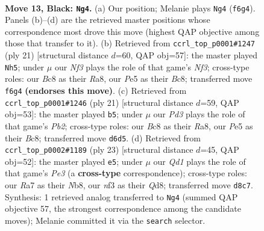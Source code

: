 \documentclass[11pt]{article}
\begin{document}
\clearpage

\begin{figure}[p]\centering
\begin{subfigure}{0.46\textwidth}\centering
\resizebox{\linewidth}{!}{%
\newchessgame
\chessboard[
  setfen={1nbq1rk1/r3bppp/pp1p1n2/4p1B1/PP2P3/2NB1N2/2P2PPP/R2Q1RK1 b - - 1 13},
  showmover=false,
  pgfstyle=straightmove, color=movearrow, markmove={f6-g4}
]}
\caption{}
\end{subfigure}\hfill
\begin{subfigure}{0.46\textwidth}\centering
\resizebox{\linewidth}{!}{%
\newchessgame
\chessboard[
  setfen={r1bq1rk1/1p2bppp/p2ppn2/n5B1/3NP3/2N3Q1/PPP1BPPP/2KR3R b - - 5 11},
  showmover=false,
  pgfstyle=straightmove, color=movearrow, markmove={f6-h5}
]}
\caption{}
\end{subfigure}
\\[4pt]
\begin{subfigure}{0.46\textwidth}\centering
\resizebox{\linewidth}{!}{%
\newchessgame
\chessboard[
  setfen={r1bq1rk1/1p2bppp/p2ppn2/n5B1/3NPP2/2NQ4/PPP1B1PP/2KR3R b - - 0 11},
  showmover=false,
  pgfstyle=straightmove, color=movearrow, markmove={b7-b5}
]}
\caption{}
\end{subfigure}\hfill
\begin{subfigure}{0.46\textwidth}\centering
\resizebox{\linewidth}{!}{%
\newchessgame
\chessboard[
  setfen={1nbq1rk1/r3bppp/p2ppn2/6B1/1p1NPP2/5B2/PPPQN1PP/2KR3R b - - 3 12},
  showmover=false,
  pgfstyle=straightmove, color=movearrow, markmove={e6-e5}
]}
\caption{}
\end{subfigure}
\caption{\textbf{Move 13, Black: \texttt{Ng4}.} (a) Our position; Melanie plays \texttt{Ng4} (\texttt{f6g4}). Panels (b)--(d) are the retrieved master positions whose correspondence most drove this move (highest QAP objective among those that transfer to it). (b) Retrieved from \texttt{ccrl\_top\_p0001\#1247} (ply 21) [structural distance $d$=60, QAP obj=57]: the master played \texttt{Nh5}; under $\mu$ our \emph{Nf3} plays the role of that game's \emph{Nf3}; cross-type roles: our \emph{B}c8 as their \emph{R}a8, our \emph{P}e5 as their \emph{B}c8; transferred move \texttt{f6g4} \textbf{(endorses this move)}. (c) Retrieved from \texttt{ccrl\_top\_p0001\#1246} (ply 21) [structural distance $d$=59, QAP obj=53]: the master played \texttt{b5}; under $\mu$ our \emph{Pd3} plays the role of that game's \emph{Pb2}; cross-type roles: our \emph{B}c8 as their \emph{R}a8, our \emph{P}e5 as their \emph{B}c8; transferred move \texttt{d6d5}. (d) Retrieved from \texttt{ccrl\_top\_p0002\#1189} (ply 23) [structural distance $d$=45, QAP obj=52]: the master played \texttt{e5}; under $\mu$ our \emph{Qd1} plays the role of that game's \emph{Pe3} (a \textbf{cross-type} correspondence); cross-type roles: our \emph{R}a7 as their \emph{N}b8, our \emph{n}f3 as their \emph{Q}d8; transferred move \texttt{d8c7}. Synthesis: 1 retrieved analog transferred to \texttt{Ng4} (summed QAP objective 57, the strongest correspondence among the candidate moves); Melanie committed it via the \texttt{search} selector.}
\label{fig:thought-m25}
\end{figure}
\end{document}
